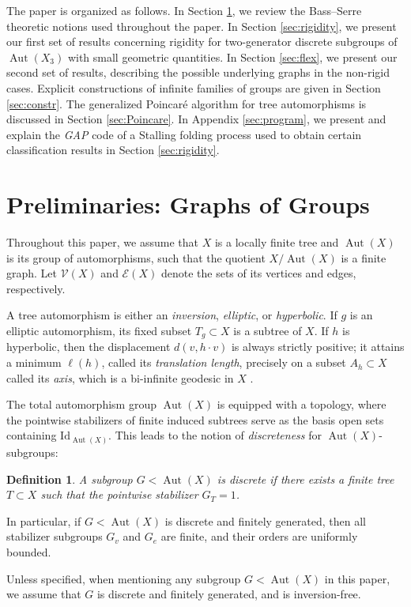 \documentclass[12pt,leqno]{amsart}
\newcommand{\2}{L^2_{\rm per}(0, T)}
\newtheorem{defn}{Definition}[section]
\newcommand{\aut}{{\operatorname{Aut}}}
\numberwithin{equation}{section}
\numberwithin{figure}{section}
\begin{document}
The paper is organized as follows. In Section \ref{sec:prelim}, we review the Bass–Serre theoretic notions used throughout the paper. In Section \ref{sec:rigidity}, we present our first set of results concerning rigidity for two-generator discrete subgroups of $\aut(X_3)$ with small geometric quantities. In Section \ref{sec:flex}, we present our second set of results, describing the possible underlying graphs in the non-rigid cases. Explicit constructions of infinite families of groups are given in Section \ref{sec:constr}. The generalized Poincar\'e algorithm for tree automorphisms is discussed in Section \ref{sec:Poincare}. In Appendix \ref{sec:program}, we present and explain the \emph{GAP} code of a Stalling folding process used to obtain certain classification results in Section \ref{sec:rigidity}. 

\section{Preliminaries: Graphs of Groups}\label{sec:prelim}
Throughout this paper, we assume that $X$ is a locally finite tree and $\aut(X)$ is its group of automorphisms, such that the quotient $X/\aut(X)$ is a finite graph. Let $\mathcal{V}(X)$ and $\mathcal{E}(X)$ denote the sets of its vertices and edges, respectively.

A tree automorphism is either an \emph{inversion}, \emph{elliptic}, or \emph{hyperbolic}. If $g$ is an elliptic automorphism, its fixed subset $T_g \subset X$ is a subtree of $X$. If $h$ is hyperbolic, then the displacement $d(v, h \cdot v)$ is always strictly positive; it attains a minimum $\ell(h)$, called its \emph{translation length}, precisely on a subset $A_h \subset X$ called its \emph{axis}, which is a bi-infinite geodesic in $X$ \cite{serre2002trees}.

The total automorphism group $\aut(X)$ is equipped with a topology, where the pointwise stabilizers of finite induced subtrees serve as the basis open sets containing $\mathrm{Id}_{\aut(X)}$. This leads to the notion of \emph{discreteness} for $\aut(X)$-subgroups:
\begin{defn}
    A subgroup $G< \aut(X)$ is \emph{discrete} if there exists a finite tree $T\subset X$ such that the pointwise stabilizer $G_T = 1$.
\end{defn}
In particular, if $G<\aut(X)$ is discrete and finitely generated, then all stabilizer subgroups $G_v$ and $G_e$ are finite, and their orders are uniformly bounded.

Unless specified, when mentioning any subgroup $G<\aut(X)$ in this paper, we assume that $G$ is discrete and finitely generated, and is inversion-free.
\end{document}
